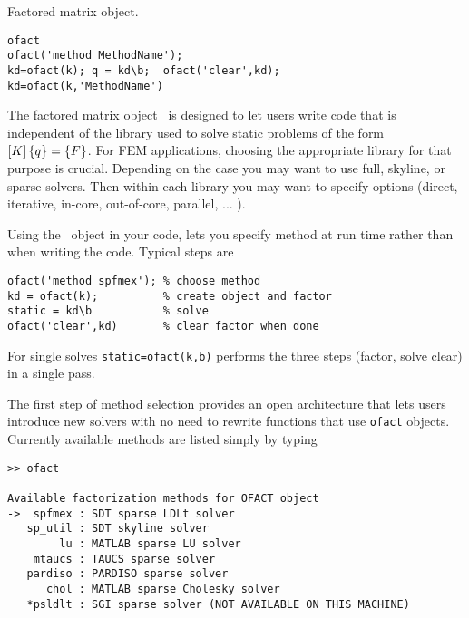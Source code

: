 

 Factored matrix object.


\begin{verbatim}
ofact
ofact('method MethodName');
kd=ofact(k); q = kd\b;  ofact('clear',kd);
kd=ofact(k,'MethodName')
\end{verbatim}


The factored matrix object \ofact\ is designed to let users write code
that is independent of the library used to solve static problems of
the form $\left[K\right]\left\{q\right\}=\left\{F\right\}$.  For FEM applications, choosing the
appropriate library for that purpose is crucial. Depending on the case
you may want to use full, skyline, or sparse solvers. Then within
each library you may want to specify options (direct, iterative,
in-core, out-of-core, parallel, ... ).

Using the \ofact\ object in your code, lets you specify method at run
time rather than when writing the code. Typical steps are

\begin{verbatim}
ofact('method spfmex'); % choose method
kd = ofact(k);          % create object and factor
static = kd\b           % solve
ofact('clear',kd)       % clear factor when done
\end{verbatim}

For single solves {\tt static=ofact(k,b)} performs the three steps (factor, solve clear) in a single pass.

The first step of method selection provides an open architecture that lets users introduce new solvers with no need to rewrite functions that use {\tt ofact} objects. Currently available methods are listed simply by typing 

\begin{verbatim}
>> ofact

Available factorization methods for OFACT object
->  spfmex : SDT sparse LDLt solver
   sp_util : SDT skyline solver
        lu : MATLAB sparse LU solver
    mtaucs : TAUCS sparse solver
   pardiso : PARDISO sparse solver
      chol : MATLAB sparse Cholesky solver
   *psldlt : SGI sparse solver (NOT AVAILABLE ON THIS MACHINE)
\end{verbatim}

